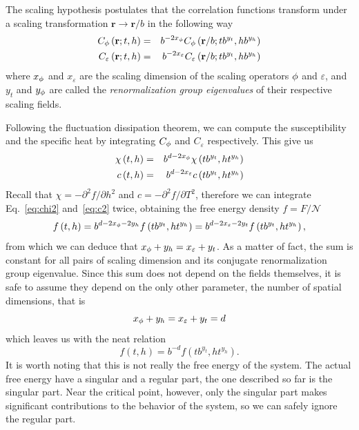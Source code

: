 The scaling hypothesis postulates that the correlation functions transform
under a scaling transformation $\mathbf{r}\rightarrow\mathbf{r}/b$ in the
following way
\begin{eqnarray}
    \label{eq:scal}
    C_{\phi}\left(\mathbf{r};t,h\right) & = &
    b^{-2x_{\phi}}C_{\phi}\left(\mathbf{r}/b;tb^{y_{t}},hb^{y_{h}}\right)\\
    \label{eq:scal10}
    C_{\varepsilon}\left(\mathbf{r};t,h\right) & = &
    b^{-2x_{\varepsilon}}C_{\varepsilon}\left(\mathbf{r}/b;tb^{y_{t}},hb^{y_{h}}\right)
\end{eqnarray}
where $x_\phi$ and $x_\varepsilon$ are the scaling dimension of the scaling
operators $\phi$ and $\varepsilon$, and $y_t$ and $y_\phi$ are called the
\textit{renormalization group eigenvalues} of their respective scaling fields.

Following the fluctuation dissipation theorem, we can compute the susceptibility
and the specific heat by integrating $C_\phi$ and $C_\varepsilon$ respectively.
This give us
\begin{eqnarray}
    \label{eq:chi2}
    \chi\left(t,h\right) & = & b^{d-2x_{\phi}}\chi\left(tb^{y_{t}},ht^{y_{h}}\right)\\
    \label{eq:c2}
    c\left(t,h\right) & = & b^{d-2x_{\varepsilon}}c\left(tb^{y_{t}},ht^{y_{h}}\right)
\end{eqnarray}
Recall that $\chi=-\partial^2 f/\partial h^2$ and $c=-\partial^2 f/\partial
T^2$, therefore we can integrate Eq.~\ref{eq:chi2} and~\ref{eq:c2} twice,
obtaining the free energy density $f=F/\mathcal{N}$
\begin{equation}
    f\left(t,h\right)=
    b^{d-2x_{\phi}-2y_{h}}f\left(tb^{y_{t}},ht^{y_{h}}\right)=
    b^{d-2x_{\varepsilon}-2y_{t}}f\left(tb^{y_{t}},ht^{y_{h}}\right),
\end{equation}
from which we can deduce that $x_\phi+y_h = x_\varepsilon+y_t$. As a matter of
fact, the sum is constant for all pairs of scaling dimension and its conjugate
renormalization group eigenvalue. Since this sum does not depend on the fields
themselves, it is safe to assume they depend on the only other parameter, the
number of spatial dimensions, that is
\begin{equation}
    \label{eq:scald}
    x_\phi+y_h = x_\varepsilon+y_t = d
\end{equation}
which leaves us with the neat relation
\begin{equation}
    f\left(t,h\right)=b^{-d}f\left(tb^{y_{t}},ht^{y_{h}}\right).
\end{equation}
It is worth noting that this is not really the free energy of the system. The
actual free energy have a singular and a regular part, the one described so
far is the singular part. Near the critical point, however, only the singular
part makes significant contributions to the behavior of the system, so we can
safely ignore the regular part.

